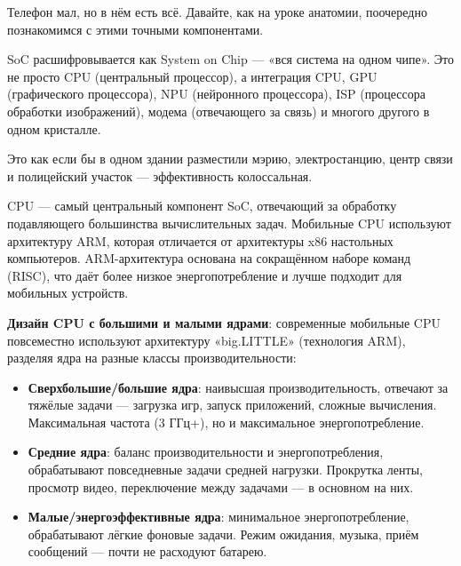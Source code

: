 


Телефон мал, но в нём есть всё. Давайте, как на уроке анатомии, поочередно познакомимся с этими точными компонентами.


SoC расшифровывается как System on Chip — «вся система на одном чипе». Это не просто CPU (центральный процессор), а интеграция CPU, GPU (графического процессора), NPU (нейронного процессора), ISP (процессора обработки изображений), модема (отвечающего за связь) и многого другого в одном кристалле.

Это как если бы в одном здании разместили мэрию, электростанцию, центр связи и полицейский участок — эффективность колоссальная.


CPU — самый центральный компонент SoC, отвечающий за обработку подавляющего большинства вычислительных задач. Мобильные CPU используют архитектуру ARM, которая отличается от архитектуры x86 настольных компьютеров. ARM-архитектура основана на сокращённом наборе команд (RISC), что даёт более низкое энергопотребление и лучше подходит для мобильных устройств.

\textbf{Дизайн CPU с большими и малыми ядрами}: современные мобильные CPU повсеместно используют архитектуру «big.LITTLE» (технология ARM), разделяя ядра на разные классы производительности:

\begin{itemize}
  \item \textbf{Сверхбольшие/большие ядра}: наивысшая производительность, отвечают за тяжёлые задачи — загрузка игр, запуск приложений, сложные вычисления. Максимальная частота (3 ГГц+), но и максимальное энергопотребление.
  \item \textbf{Средние ядра}: баланс производительности и энергопотребления, обрабатывают повседневные задачи средней нагрузки. Прокрутка ленты, просмотр видео, переключение между задачами — в основном на них.
  \item \textbf{Малые/энергоэффективные ядра}: минимальное энергопотребление, обрабатывают лёгкие фоновые задачи. Режим ожидания, музыка, приём сообщений — почти не расходуют батарею.
\end{itemize}

